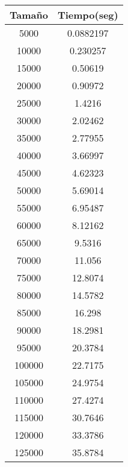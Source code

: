 \begin{longtable}{|c|c|}
\hline
\textbf{Tamaño} & \textbf{Tiempo(seg)} \\ \hline
5000   & 0.0882197   \\ \hline
10000  & 0.230257    \\ \hline
15000  & 0.50619     \\ \hline
20000  & 0.90972     \\ \hline
25000  & 1.4216      \\ \hline
30000  & 2.02462     \\ \hline
35000  & 2.77955     \\ \hline
40000  & 3.66997     \\ \hline
45000  & 4.62323     \\ \hline
50000  & 5.69014     \\ \hline
55000  & 6.95487     \\ \hline
60000  & 8.12162     \\ \hline
65000  & 9.5316      \\ \hline
70000  & 11.056      \\ \hline
75000  & 12.8074     \\ \hline
80000  & 14.5782     \\ \hline
85000  & 16.298      \\ \hline
90000  & 18.2981     \\ \hline
95000  & 20.3784     \\ \hline
100000 & 22.7175     \\ \hline
105000 & 24.9754     \\ \hline
110000 & 27.4274     \\ \hline
115000 & 30.7646      \\ \hline
120000 & 33.3786     \\ \hline
125000 & 35.8784      \\ \hline
\end{longtable}
